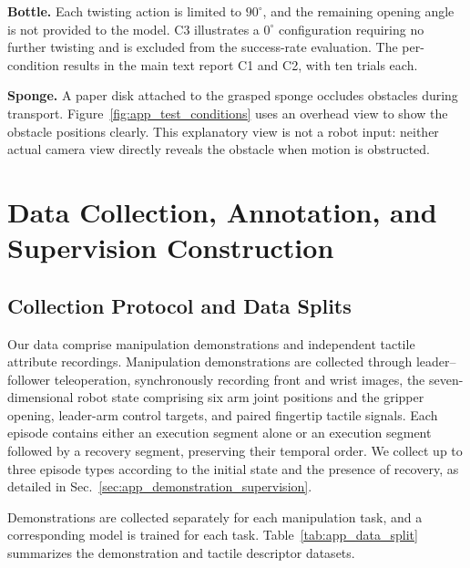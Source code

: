 \textbf{Bottle.} Each twisting action is limited to $90^\circ$, and the remaining opening angle is not provided to the model. C3 illustrates a $0^\circ$ configuration requiring no further twisting and is excluded from the success-rate evaluation. The per-condition results in the main text report C1 and C2, with ten trials each.

\textbf{Sponge.} A paper disk attached to the grasped sponge occludes obstacles during transport. Figure~\ref{fig:app_test_conditions} uses an overhead view to show the obstacle positions clearly. This explanatory view is not a robot input: neither actual camera view directly reveals the obstacle when motion is obstructed.

\section{Data Collection, Annotation, and Supervision Construction}
\label{sec:app_data}

\subsection{Collection Protocol and Data Splits}
\label{sec:app_collection_split}

Our data comprise manipulation demonstrations and independent tactile attribute recordings. Manipulation demonstrations are collected through leader--follower teleoperation, synchronously recording front and wrist images, the seven-dimensional robot state comprising six arm joint positions and the gripper opening, leader-arm control targets, and paired fingertip tactile signals. Each episode contains either an execution segment alone or an execution segment followed by a recovery segment, preserving their temporal order. We collect up to three episode types according to the initial state and the presence of recovery, as detailed in Sec.~\ref{sec:app_demonstration_supervision}.

Demonstrations are collected separately for each manipulation task, and a corresponding model is trained for each task. Table~\ref{tab:app_data_split} summarizes the demonstration and tactile descriptor datasets.

